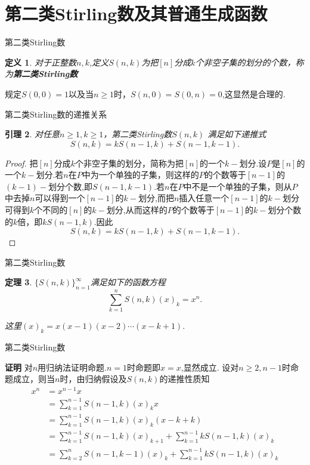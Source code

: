 \documentclass[punct]{ctexbeamer}
\newtheorem{thm}{定理}[section]
\newtheorem{defi}[thm]{定义}
\newtheorem{lem}[thm]{引理}
\begin{document}
\section{第二类Stirling数及其普通生成函数}
\begin{frame}{第二类Stirling数}
	\begin{defi}
		对于正整数$n,k$,定义$S(n,k)$为把$[n]$分成$k$个非空子集的划分的个数，称为\bf{第二类Stirling数}
	\end{defi}
	规定$S(0,0)=1$以及当$n \geq 1$时，$S(n,0)=S(0,n)=0$,这显然是合理的.
\end{frame}
\begin{frame}{第二类Stirling数的递推关系}
	\begin{lem}
		对任意$n\geq 1,k\geq 1$，第二类Stirling数$S(n,k)$ 满足如下递推式
		$$S(n,k)=kS(n-1,k)+S(n-1,k-1).$$
	\end{lem}
\pause
    \begin{proof}
    	把$[n]$分成$k$个非空子集的划分，简称为把$[n]$的一个$k-$划分.设$P$是$[n]$的一个$k-$划分.若$n$在$P$中为一个单独的子集，则这样的$P$的个数等于$[n-1]$的$(k-1)-$划分个数,即$S(n-1,k-1)$.若$n$在$P$中不是一个单独的子集，则从$P$中去掉$n$可以得到一个$[n-1]$的$k-$划分,而把$n$插入任意一个$[n-1]$的$k-$划分可得到$k$个不同的$[n]$的$k-$划分,从而这样的$P$的个数等于$[n-1]$的$k-$划分个数的$k$倍，即$kS(n-1,k)$.因此
    	$$S(n,k)=kS(n-1,k)+S(n-1,k-1).$$
    \end{proof}
\end{frame}
\begin{frame}{第二类Stirling数}
   \begin{thm}
   	$\{S(n,k)\}_{n=1}^{\infty}$满足如下的函数方程
   	$$\sum_{k=1}^n{S(n,k)(x)_k}=x^n.$$
   	
   	这里$(x)_k=x(x-1)(x-2)\cdots(x-k+1).$
   \end{thm}
\end{frame}	
\begin{frame}{第二类Stirling数}
	
   {\bf 证明}
   	对$n$用归纳法证明命题.$n=1$时命题即$x=x$,显然成立.
   	设对$n \geq 2,n-1$时命题成立，则当$n$时，由归纳假设及$S(n,k)$的递推性质知
   		\[\begin{aligned}
   		x^n &=x^{n-1} x \\
   		&=\sum_{k=1}^{n-1} S(n-1, k)(x)_k x \\
   		&=\sum_{k=1}^{n-1} S(n-1, k)(x)_k(x-k+k) \\
   		&=\sum_{k=1}^{n-1} S(n-1, k)(x)_{k+1}+\sum_{k=1}^{n-1} k S(n-1, k)(x)_k \\
   		&=\sum_{k=2}^n S(n-1, k-1)(x)_k+\sum_{k=1}^{n-1} k S(n-1, k)(x)_k \\
      \end{aligned}
        \]
    
\end{frame}		
\end{document}
